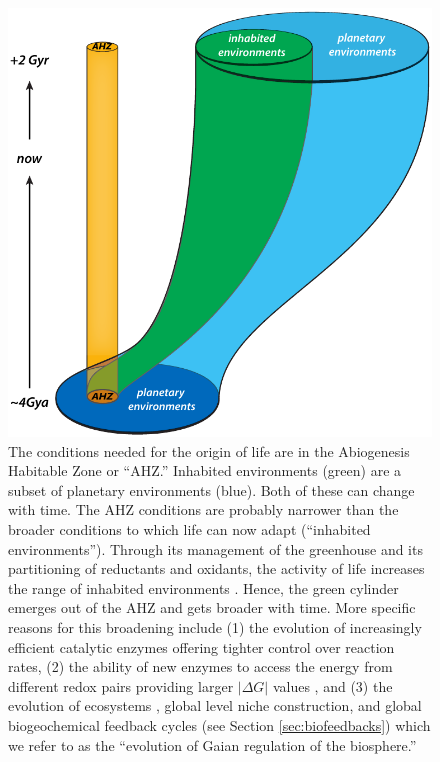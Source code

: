 \begin{figure}[!ht]
	\centering
	\includegraphics[width=0.6\linewidth]{figures/AHZ.pdf}
	\caption[Abiogenesis Habitable Zone]{The conditions needed for the origin of life are in the Abiogenesis Habitable Zone  or ``AHZ.''
		Inhabited environments (green) are a subset of planetary environments (blue).
		Both of these can change with time.
		The AHZ conditions are probably narrower than the broader conditions to which life can now adapt (``inhabited environments'').
		Through its management of the greenhouse and its partitioning of reductants and oxidants, the activity of life increases the range of inhabited environments \citep{Nisbet2007}.
		Hence, the green cylinder emerges out of the AHZ and gets broader with time.
		More specific reasons for this broadening include (1) the evolution of increasingly efficient catalytic enzymes offering tighter control over reaction rates, 
		(2) the ability of new enzymes to access the energy from different redox pairs providing larger $|\Delta G|$ values \citep{Nealson1999}, and
		(3) the evolution of ecosystems \citep{Smith2015}, global level niche construction, and global biogeochemical feedback cycles (see Section \ref{sec:biofeedbacks}) which we refer to as 
		the ``evolution of Gaian regulation of the biosphere.''
	}
	\label{fig:AHZ}
\end{figure}

